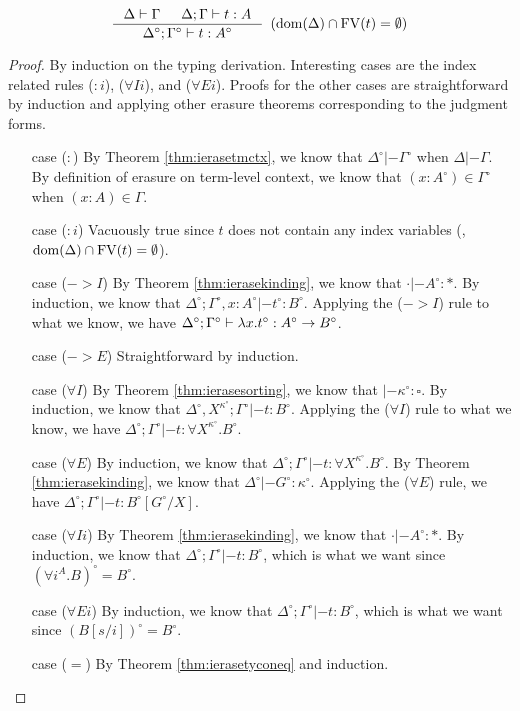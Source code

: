 \begin{theorem}
\label{thm:ierasetypingifree}
\[ \inference{ \Delta |- \Gamma & \Delta;\Gamma |- t : A}
		{\Delta^\circ;\Gamma^\circ |- t : A^\circ}
		{\enspace(\dom(\Delta)\cap\FV(t) = \emptyset)}
\]
\end{theorem}
\begin{proof} By induction on the typing derivation.
	Interesting cases are the index related rules ($:i$), ($\forall Ii$),
	and ($\forall Ei$). Proofs for the other cases are straightforward
	by induction and applying other erasure theorems corresponding to
	the judgment forms.
\begin{itemize}
\item[case] ($:$)
	By Theorem \ref{thm:ierasetmctx}, we know that
	$\Delta^\circ|- \Gamma^\circ$ when $\Delta|- \Gamma$.
	By definition of erasure on term-level context, we know that
	$(x:A^\circ) \in \Gamma^\circ$ when $(x:A) \in \Gamma$.
\item[case] ($:i$)
	Vacuously true since $t$ does not contain any index variables
        (\ie, $\mathop{\mathrm{dom}}(\Delta)\cap\mathop{\mathrm{FV}}(t) = \emptyset$).
\item[case] ($->$$I$)
	By Theorem \ref{thm:ierasekinding}, we know that $\cdot |- A^\circ:*$.
	By induction, we know that
	$\Delta^\circ;\Gamma^\circ,x:A^\circ |- t^\circ : B^\circ$.
	Applying the ($->$$I$) rule to what we know, we have
	$\Delta^\circ;\Gamma^\circ |- \lambda x.t^\circ : A^\circ -> B^\circ$.
\item[case] ($->$$E$)
	Straightforward by induction.
\item[case] ($\forall I$)
	By Theorem \ref{thm:ierasesorting}, we know that
	$|- \kappa^\circ:\square$.
	By induction, we know that
	$\Delta^\circ,X^{\kappa^\circ};\Gamma^\circ |- t : B^\circ$.
	Applying the ($\forall I$) rule to what we know, we have
	$\Delta^\circ;\Gamma^\circ |- t : \forall X^{\kappa^\circ}.B^\circ$.
\item[case] ($\forall E$)
	By induction, we know that
	$\Delta^\circ;\Gamma^\circ |- t : \forall X^{\kappa^\circ}.B^\circ$.
	By Theorem \ref{thm:ierasekinding}, we know that
	$\Delta^\circ |- G^\circ : \kappa^\circ$.
	Applying the ($\forall E$) rule, we have
	$\Delta^\circ;\Gamma^\circ |- t : B^\circ[G^\circ / X]$.
\item[case] ($\forall Ii$)
	By Theorem \ref{thm:ierasekinding}, we know that $\cdot |- A^\circ:*$.
	By induction, we know that $\Delta^\circ;\Gamma^\circ |- t : B^\circ$,
	which is what we want since $(\forall i^A.B)^\circ = B^\circ$.
\item[case] ($\forall Ei$)
	By induction, we know that $\Delta^\circ;\Gamma^\circ |- t : B^\circ$,
	which is what we want since $(B[s/i])^\circ = B^\circ$.
\item[case] ($=$)
	By Theorem \ref{thm:ierasetyconeq} and induction.
\end{itemize}\qedhere
\end{proof}

